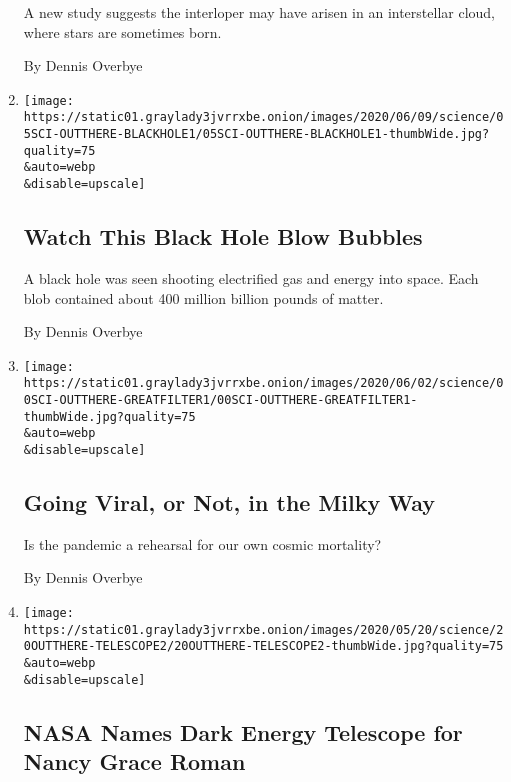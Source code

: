 \begin{enumerate}
  A new study suggests the interloper may have arisen in an interstellar
  cloud, where stars are sometimes born.

  By Dennis Overbye
\item
  \href{/2020/06/05/science/black-hole-astronomy.html}{}

  \texttt{[image: https://static01.graylady3jvrrxbe.onion/images/2020/06/09/science/05SCI-OUTTHERE-BLACKHOLE1/05SCI-OUTTHERE-BLACKHOLE1-thumbWide.jpg?quality=75\\\&auto=webp\\\&disable=upscale]}

  \hypertarget{watch-this-black-hole-blow-bubbles}{%
  \subsection{Watch This Black Hole Blow
  Bubbles}\label{watch-this-black-hole-blow-bubbles}}

  A black hole was seen shooting electrified gas and energy into space.
  Each blob contained about 400 million billion pounds of matter.

  By Dennis Overbye
\item
  \href{/2020/06/02/science/coronavirus-space-travel-colonization.html}{}

  \texttt{[image: https://static01.graylady3jvrrxbe.onion/images/2020/06/02/science/00SCI-OUTTHERE-GREATFILTER1/00SCI-OUTTHERE-GREATFILTER1-thumbWide.jpg?quality=75\\\&auto=webp\\\&disable=upscale]}

  \hypertarget{going-viral-or-not-in-the-milky-way}{%
  \subsection{Going Viral, or Not, in the Milky
  Way}\label{going-viral-or-not-in-the-milky-way}}

  Is the pandemic a rehearsal for our own cosmic mortality?

  By Dennis Overbye
\item
  \href{/2020/05/20/science/nancy-grace-roman-telescope.html}{}

  \texttt{[image: https://static01.graylady3jvrrxbe.onion/images/2020/05/20/science/20OUTTHERE-TELESCOPE2/20OUTTHERE-TELESCOPE2-thumbWide.jpg?quality=75\\\&auto=webp\\\&disable=upscale]}

  \hypertarget{nasa-names-dark-energy-telescope-for-nancy-grace-roman}{%
  \subsection{NASA Names Dark Energy Telescope for Nancy Grace
  Roman}\label{nasa-names-dark-energy-telescope-for-nancy-grace-roman}}


\end{enumerate}
